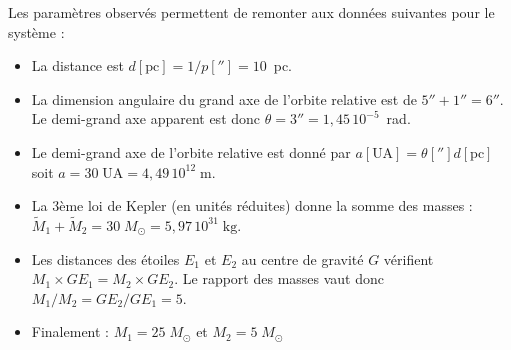 \documentclass[a4paper,10pt]{report}
\newcommand{\e}[1]{\ensuremath{\, 10^{#1}}}
\newcommand{\UA}{\ensuremath{\textrm{UA}}}
\renewcommand{\u}[1]{\ensuremath{\mathrm{#1}}} %
\begin{document}
\begin{Answer}
  Les paramètres observés permettent de remonter aux données suivantes
  pour le système :
  \begin{itemize}
  \item La distance est $d[\u{pc}] = 1/p[''] = 10$~pc.
  \item La dimension angulaire du grand axe de l'orbite relative est
    de $5'' + 1'' = 6''$. Le demi-grand axe apparent est donc $\theta
    = 3'' = 1,45\e{-5}$~rad.
  \item Le demi-grand axe de l'orbite relative est donné par
    $a[\UA] = \theta[''] d[\u{pc}]$ soit $a = 30\;\UA = 4,49\e{12}\;\u{m}$.
  \item La 3ème loi de Kepler (en unités réduites) donne la somme des
    masses : $\tilde{M}_{1} + \tilde{M}_{2} = 30\;M_{\odot} =
    5,97\e{31}\;\u{kg}$.
  \item Les distances des étoiles $E_1$ et $E_2$ au centre de gravité
    $G$ vérifient $M_1 \times GE_1 = M_2 \times GE_2$. Le rapport des
    masses vaut donc $M_1 / M_2 = GE_2 / GE_1 = 5$.
  \item Finalement : $M_1 = 25\;M_{\odot}$ et $M_2 = 5\;M_{\odot}$
  \end{itemize}
\end{Answer}
\end{document}

